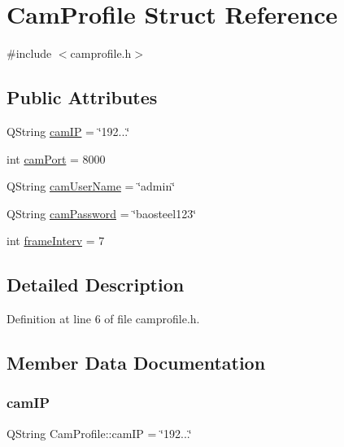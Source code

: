 \hypertarget{struct_cam_profile}{}\section{Cam\+Profile Struct Reference}
\label{struct_cam_profile}


{\ttfamily \#include $<$camprofile.\+h$>$}

\subsection*{Public Attributes}
\begin{DoxyCompactItemize}
\item 
Q\+String \mbox{\hyperlink{struct_cam_profile_a073029c3e54b02fd1a3b18e19032586c}{cam\+IP}} = \char`\"{}192...\char`\"{}
\item 
int \mbox{\hyperlink{struct_cam_profile_aa0b5ff29518521fa54e3d10b13176cea}{cam\+Port}} = 8000
\item 
Q\+String \mbox{\hyperlink{struct_cam_profile_a0ea16ae25e305f80425bd43aaebd5e03}{cam\+User\+Name}} = \char`\"{}admin\char`\"{}
\item 
Q\+String \mbox{\hyperlink{struct_cam_profile_a858a51162bbd2a1b3cee2efddf16c65f}{cam\+Password}} = \char`\"{}baosteel123\char`\"{}
\item 
int \mbox{\hyperlink{struct_cam_profile_a305832f4d32f5a7c42fa44a07e9e2565}{frame\+Interv}} = 7
\end{DoxyCompactItemize}


\subsection{Detailed Description}


Definition at line 6 of file camprofile.\+h.



\subsection{Member Data Documentation}
\mbox{\label{struct_cam_profile_a073029c3e54b02fd1a3b18e19032586c}} 
\subsubsection{\texorpdfstring{cam\+IP}{camIP}}
{\footnotesize\ttfamily Q\+String Cam\+Profile\+::cam\+IP = \char`\"{}192...\char`\"{}}




